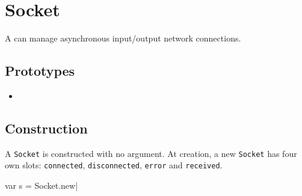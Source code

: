 \section{Socket}

A  can manage asynchronous input/output network
connections.

\subsection{Prototypes}
\begin{itemize}
\item {}
\end{itemize}

\subsection{Construction}

A \lstinline|Socket| is constructed with no argument. At creation, a
new \lstinline|Socket| has four own slots: \lstinline|connected|,
\lstinline|disconnected|, \lstinline|error| and \lstinline|received|.

\begin{urbiscript}
var s = Socket.new|
\end{urbiscript}

